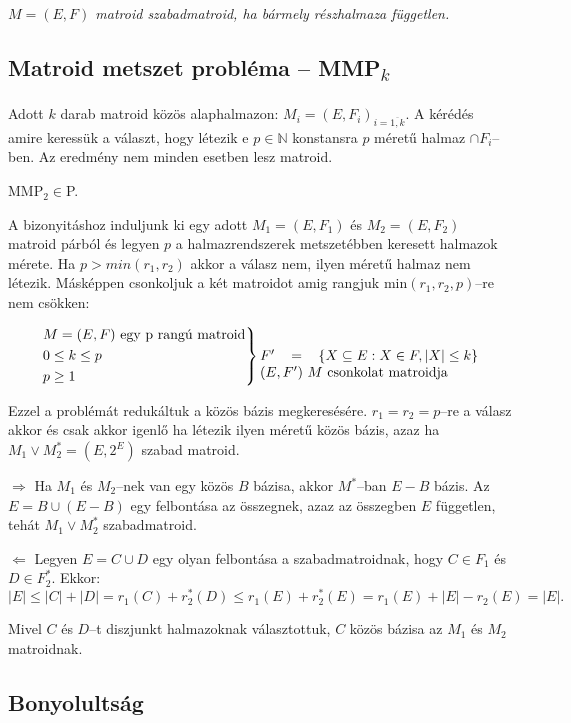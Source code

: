 \vspace{0.4cm}
\emph{$M=(E,F)$ matroid szabadmatroid, ha bármely részhalmaza független.}

\subsection{\texorpdfstring{Matroid metszet probléma -- MMP\textsubscript{$k$}}
			{Matroid metszet probléma -- MMPk}}

Adott $k$ darab matroid közös alaphalmazon: $M_i=(E,F_i)_{i=\overline{1,k}}$. A
kérédés amire keressük a választ, hogy létezik e $p \in \mathbb{N}$ konstansra
$p$ méretű halmaz $\cap F_i$--ben. Az eredmény nem minden esetben lesz matroid.

\vspace{0.4cm}
MMP$_2 \in $P.
\vspace{0.4cm}

A bizonyitáshoz induljunk ki egy adott $M_1=(E,F_1)$ és $M_2=(E,F_2)$ matroid
párból és legyen $p$ a halmazrendszerek metszetébben keresett halmazok mérete.
Ha $p>min(r_1, r_2)$ akkor a válasz nem, ilyen méretű halmaz nem létezik.
Másképpen csonkoljuk a két matroidot amig rangjuk min$(r_1,r_2, p)$--re nem
csökken:

\[ \begin{rcases}
M=(E,F) \mbox{ egy p rangú matroid} \\
0 \leq k \leq p \\ 
p \geq 1 
\end{rcases} \parbox[t]{5.5cm}
{$F' = \left\{ X \subseteq E: X \in F, |X| \leq k \right\}$ 
$(E,F')~M$ csonkolat matroidja} \]

Ezzel a problémát redukáltuk a közös bázis megkeresésére. $r_1=r_2=p$--re a
válasz akkor és csak akkor igenlő ha létezik ilyen méretű közös bázis, azaz ha
$M_1 \vee M_2^*=(E,2^E)$ szabad matroid.

$\Rightarrow$ Ha $M_1$ és $M_2$--nek van egy közös $B$ bázisa, akkor $M^*$--ban
$E-B$ bázis. Az $E=B \cup (E-B)$ egy felbontása az összegnek, azaz az összegben
$E$ független, tehát $M_1 \vee M_2^*$ szabadmatroid.

$\Leftarrow$ Legyen $E=C \cup D$ egy olyan felbontása a szabadmatroidnak, hogy
$C \in F_1$ és $D \in F_2^*$. Ekkor:
\[|E| \leq |C| + |D| = r_1(C) + r_2^*(D) \leq r_1(E)+r_2^*(E) = r_1(E) + |E| - r_2(E)=|E|. \]

Mivel $C$ és $D$--t diszjunkt halmazoknak választottuk, $C$ közös bázisa az $M_1$ és
$M_2$ matroidnak.

\subsection{Bonyolultság}

